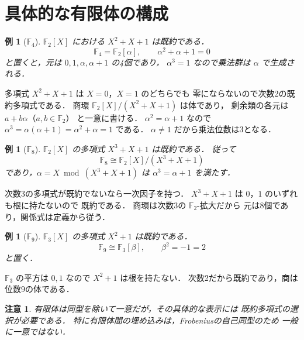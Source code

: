\documentclass[a5paper,10pt,onecolumn]{jsarticle}
\makeatletter
\theoremstyle{mathnotetheorem}
\newtheorem{example}[theorem]{例}
\newtheorem{remark}[theorem]{注意}
\renewcommand{\proofname}{証明}
\renewenvironment{proof}[1][\proofname]{%
  \par\pushQED{\qed}\normalfont\topsep4\p@\@plus2\p@\relax
  \trivlist\item[\hskip\labelsep\bfseries #1]\ignorespaces
}{\popQED\endtrivlist\@endpefalse}
\makeatother
\begin{document}
\section{具体的な有限体の構成}

\begin{example}[$\mathbb F_4$]
$\mathbb F_2[X]$ における $X^2+X+1$ は既約である．
\[
 \mathbb F_4=\mathbb F_2[\alpha],\qquad
 \alpha^2+\alpha+1=0
\]
と置くと，元は $0,1,\alpha,\alpha+1$ の4個であり，
$\alpha^3=1$ なので乗法群は $\alpha$ で生成される．
\end{example}
\begin{proof}
多項式 $X^2+X+1$ は $X=0$，$X=1$ のどちらでも
零にならないので次数2の既約多項式である．
商環 $\mathbb F_2[X]/(X^2+X+1)$ は体であり，
剰余類の各元は $a+b\alpha$（$a,b\in\mathbb F_2$）
と一意に書ける．
$\alpha^2=\alpha+1$ なので
$\alpha^3=\alpha(\alpha+1)=\alpha^2+\alpha=1$ である．
$\alpha\ne1$ だから乗法位数は3となる．
\end{proof}

\begin{example}[$\mathbb F_8$]
$\mathbb F_2[X]$ の多項式 $X^3+X+1$ は既約である．
従って
\[
 \mathbb F_8\cong\mathbb F_2[X]/(X^3+X+1)
\]
であり，$\alpha=X\bmod(X^3+X+1)$ は
$\alpha^3=\alpha+1$ を満たす．
\end{example}
\begin{proof}
次数3の多項式が既約でないなら一次因子を持つ．
$X^3+X+1$ は $0$，$1$ のいずれも根に持たないので
既約である．
商環は次数3の $\mathbb F_2$-拡大だから
元は8個であり，関係式は定義から従う．
\end{proof}

\begin{example}[$\mathbb F_9$]
$\mathbb F_3[X]$ の多項式 $X^2+1$ は既約である．
\[
 \mathbb F_9\cong\mathbb F_3[\beta],
 \qquad \beta^2=-1=2
\]
と置く．
\end{example}
\begin{proof}
$\mathbb F_3$ の平方は $0,1$ なので
$X^2+1$ は根を持たない．
次数2だから既約であり，商は位数9の体である．
\end{proof}

\begin{remark}
有限体は同型を除いて一意だが，その具体的な表示には
既約多項式の選択が必要である．
特に有限体間の埋め込みは，Frobeniusの自己同型のため
一般に一意ではない．
\end{remark}
\end{document}
